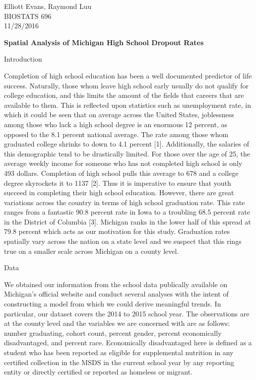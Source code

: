 \documentclass[12pt,letterpaper]{article}
\begin{document}
\begin{flushright}
Elliott Evans, Raymond Luu\\ BIOSTATS 696\\ 11/28/2016
\end{flushright}

\begin{center}
\LARGE\textbf{Spatial Analysis of Michigan High School Dropout Rates}
\end{center}

\begin{flushleft}
\LARGE{Introduction}
\end{flushleft}

\begin{flushleft} 
\quad Completion of high school education has been a well documented predictor of life success. Naturally, those whom leave high school early usually do not qualify for college education, and this limits the amount of the fields that careers that are available to them. This is reflected upon statistics such as unemployment rate, in which it could be seen that on average across the United States, joblessness among those who lack a high school degree is an enormous 12 percent, as opposed to the 8.1 percent national average. The rate among those whom graduated college shrinks to down to 4.1 percent [1]. Additionally, the salaries of this demographic tend to be drastically limited. For those over the age of 25, the average weekly income for someone who has not completed high school is only 493 dollars. Completion of high school pulls this average to 678 and a college degree skyrockets it to 1137 [2]. Thus it is imperative to ensure that youth succeed in completing their high school education. However, there are great variations across the country in terms of high school graduation rate. This rate ranges from a fantastic 90.8 percent rate in Iowa to a troubling 68.5 percent rate in the District of Columbia [3]. Michigan ranks in the lower half of this spread at 79.8 percent which acts as our motivation for this study. Graduation rates spatially vary across the nation on a state level and we suspect that this rings true on a smaller scale across Michigan on a county level. 


\begin{flushleft}
\LARGE{Data}
\end{flushleft}

\quad We obtained our information from the school data publically available on Michigan's official website and conduct several analyses with the intent of constructing a model from which we could derive meaningful trends. In particular, our dataset covers the 2014 to 2015 school year. The observations are at the county level and the variables we are concerned with are as follows: number graduating, cohort count, percent gender, percent economically disadvantaged, and percent race. Economically disadvantaged here is defined as a student who has been reported as eligible for supplemental nutrition in any certified collection in the MSDS in the current school year by any reporting entity or directly certified or reported as homeless or migrant. 


\end{flushleft}
\end{document}
